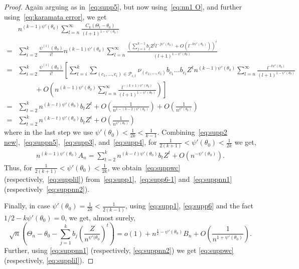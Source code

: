 \documentclass[12pt]{amsart}
\theoremstyle{plain}
\theoremstyle{remark}
\numberwithin{equation}{section}
\begin{document}
\begin{proof}
Again arguing as in~\eqref{eq:supp5}, but now using~\eqref{eq:nn1 O}, and further using~\eqref{eq:karamata error}, we get
\begin{align}\label{eq:suppn5}
&n^{(k-1) \psi'(\theta_0)} \sum_{l=n}^{\infty} \frac{C_{k}(\Theta_l - \theta_0)}{{(l+1)}^{1-\psi'(\theta_0)}} %
\nonumber\\
= &\sum_{i=2}^{k}\frac{\psi^{(i)}(\theta_0)}{i!}n^{(k-1) \psi'(\theta_0)} \sum_{l=n}^{\infty}\frac{\left(\sum_{j = 1}^{k-1} b_j {Z}^j l^{-j \psi'(\theta_0)} + O(l^{-k\psi'(\theta_0)})\right)^i}{{(l+1)}^{1-\psi'(\theta_0)}} \nonumber
    \\  =& \sum_{i=2}^{k}\frac{\psi^{(i)}(\theta_0)}{i!}\left[\sum_{t=i}^{k}\sum_{(c_1, \ldots, c_i) \in \mathcal{P}_{i,t}}\nu_{(c_1, \ldots, c_i)}b_{c_1}\ldots b_{c_i}Z^{t}n^{(k-1)\psi'(\theta_0)}\sum_{l=n}^{\infty}\frac{{l}^{-t\psi'(\theta_0)}}{{(l+1)}^{1-\psi'(\theta_0)}}%
    \right. \nonumber \\  & \hspace{1cm} + \left. O\left(n^{(k-1)\psi'(\theta_0)}\sum_{l=n}^{\infty}\frac{{l}^{-(k+1)\psi'(\theta_0)}}{{(l+1)}^{1-\psi'(\theta_0)}}\right)\right] \nonumber \\
    =& \sum_{t=2}^{k}n^{(k-t) \psi'(\theta_0)} b_t Z^{t} +
    O\left(\frac{1}{n^{1-(k-2)\psi'(\theta_0)}}\right) 
    + O\left(\frac{1}{n^{\psi'(\theta_0)}}\right) \nonumber %
    \\ =& \sum_{t=2}^{k}n^{(k-t)\psi'(\theta_0)}b_t Z^{t} +  O\left(\frac{1}{n^{\psi'(\theta_0)}}\right) %
\end{align}
where in the last step we use $\psi'(\theta_0) < \frac1{2k} < \frac1{k-1}$.
Combining~\eqref{eq:supp2 new},~\eqref{eq:suppn5},~\eqref{eq:supp3}, and~\eqref{eq:supp4}, for $\frac{1}{2(k+1)} < \psi'(\theta_0) < \frac{1}{2k}$ we get,
\begin{align}\label{eq:supp6-1}
   n^{(k-1)\psi'(\theta_0)}A_n = \sum_{t=2}^{k}n^{(k-t)\psi'(\theta_0)}b_t Z^{t} + O\left({n^{-\psi'(\theta_0)}}\right).
\end{align}
Thus, for $\frac{1}{2(k+1)} < \psi'(\theta_0) < \frac{1}{2k}$, we obtain~\eqref{eq:suppwc} (respectively,~\eqref{eq:supplil}) from~\eqref{eq:supp1},~\eqref{eq:supp6-1} 
and~\eqref{eq:suppnn1} (respectively~\eqref{eq:suppnn2}).

Finally, in case $\psi'(\theta_0) = \frac{1}{2k} < \frac{1}{2(k-1)}$, using \eqref{eq:supp1}, \eqref{eq:supp6} and the fact $1/2 - k\psi'(\theta_0) = 0$, we get, almost surely,
\[
\sqrt{n} \left( \Theta_n - \theta_0 - \sum_{j=1}^k b_j \left( \frac{Z}{n^{\psi'(\theta_0}} \right)^t \right) = o(1) + n^{\frac12 - \psi'(\theta_0)} B_n + O \left( \frac1{n^{1+\psi'(\theta_0)}} \right).
\]
Further, using \eqref{eq:suppnn1} (respectively, \eqref{eq:suppnn2}) we get \eqref{eq:suppwc} (respectively, \eqref{eq:supplil}). 
\end{proof}
\end{document}
